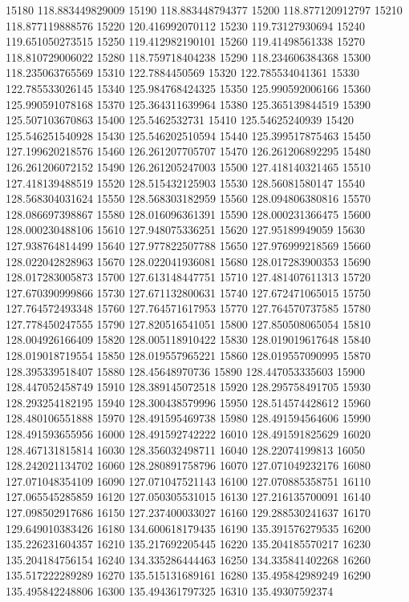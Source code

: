 {15180 118.883449829009
15190 118.883448794377
15200 118.877120912797
15210 118.877119888576
15220 120.416992070112
15230 119.73127930694
15240 119.651050273515
15250 119.412982190101
15260 119.41498561338
15270 118.810729006022
15280 118.759718404238
15290 118.234606384368
15300 118.235063765569
15310 122.7884450569
15320 122.785534041361
15330 122.785533026145
15340 125.984768424325
15350 125.990592006166
15360 125.990591078168
15370 125.364311639964
15380 125.365139844519
15390 125.507103670863
15400 125.5462532731
15410 125.54625240939
15420 125.546251540928
15430 125.546202510594
15440 125.399517875463
15450 127.199620218576
15460 126.261207705707
15470 126.261206892295
15480 126.261206072152
15490 126.261205247003
15500 127.418140321465
15510 127.418139488519
15520 128.515432125903
15530 128.56081580147
15540 128.568304031624
15550 128.568303182959
15560 128.094806380816
15570 128.086697398867
15580 128.016096361391
15590 128.000231366475
15600 128.000230488106
15610 127.948075336251
15620 127.95189949059
15630 127.938764814499
15640 127.977822507788
15650 127.976999218569
15660 128.022042828963
15670 128.022041936081
15680 128.017283900353
15690 128.017283005873
15700 127.613148447751
15710 127.481407611313
15720 127.670390999866
15730 127.671132800631
15740 127.672471065015
15750 127.764572493348
15760 127.764571617953
15770 127.764570737585
15780 127.778450247555
15790 127.820516541051
15800 127.850508065054
15810 128.004926166409
15820 128.005118910422
15830 128.019019617648
15840 128.019018719554
15850 128.019557965221
15860 128.019557090995
15870 128.395339518407
15880 128.45648970736
15890 128.447053335603
15900 128.447052458749
15910 128.389145072518
15920 128.295758491705
15930 128.293254182195
15940 128.300438579996
15950 128.514574428612
15960 128.480106551888
15970 128.491595469738
15980 128.491594564606
15990 128.491593655956
16000 128.491592742222
16010 128.491591825629
16020 128.467131815814
16030 128.356032498711
16040 128.22074199813
16050 128.242021134702
16060 128.280891758796
16070 127.071049232176
16080 127.071048354109
16090 127.071047521143
16100 127.070885358751
16110 127.065545285859
16120 127.050305531015
16130 127.216135700091
16140 127.098502917686
16150 127.237400033027
16160 129.288530241637
16170 129.649010383426
16180 134.600618179435
16190 135.391576279535
16200 135.226231604357
16210 135.217692205445
16220 135.204185570217
16230 135.204184756154
16240 134.335286444463
16250 134.335841402268
16260 135.517222289289
16270 135.515131689161
16280 135.495842989249
16290 135.495842248806
16300 135.494361797325
16310 135.49307592374
}
